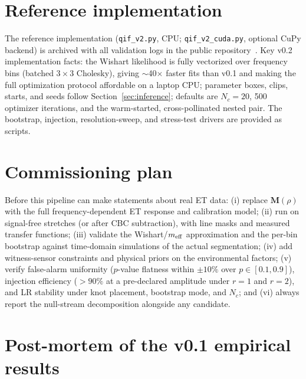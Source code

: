 \documentclass[11pt]{article}
\begin{document}
\section{Reference implementation}
\label{sec:implementation}

The reference implementation (\texttt{qif\_v2.py}, CPU; \texttt{qif\_v2\_cuda.py}, optional CuPy backend) is archived with all validation logs in the public repository~\cite{repo}. Key v0.2 implementation facts: the Wishart likelihood is fully vectorized over frequency bins (batched $3\times3$ Cholesky), giving $\sim$40$\times$ faster fits than v0.1 and making the full optimization protocol affordable on a laptop CPU; parameter boxes, clips, starts, and seeds follow Section~\ref{sec:inference}; defaults are $N_c = 20$, 500 optimizer iterations, and the warm-started, cross-pollinated nested pair. The bootstrap, injection, resolution-sweep, and stress-test drivers are provided as scripts.

\section{Commissioning plan}
\label{sec:plan}

Before this pipeline can make statements about real ET data: (i) replace $\mathbf{M}(\rho)$ with the full frequency-dependent ET response and calibration model; (ii) run on signal-free stretches (or after CBC subtraction), with line masks and measured transfer functions; (iii) validate the Wishart/$m_{\rm eff}$ approximation and the per-bin bootstrap against time-domain simulations of the actual segmentation; (iv) add witness-sensor constraints and physical priors on the environmental factors; (v) verify false-alarm uniformity ($p$-value flatness within $\pm 10\%$ over $p \in [0.1, 0.9]$), injection efficiency ($>90\%$ at a pre-declared amplitude under $r = 1$ and $r = 2$), and LR stability under knot placement, bootstrap mode, and $N_c$; and (vi) always report the null-stream decomposition alongside any candidate.

\appendix

\section{Post-mortem of the v0.1 empirical results}
\label{app:postmortem}
\end{document}

